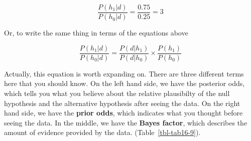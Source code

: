 \documentclass[
  a4paper,
]{book}
\begin{document}
\[\frac{P(h_1|d)}{P(h_0|d)}=\frac{0.75}{0.25}=3\]

Or, to write the same thing in terms of the equations above

\[\frac{P(h_1|d)}{P(h_0|d)}=\frac{P(d|h_1)}{P(d|h_0)} \times \frac{P(h_1)}{P(h_0)}\]

Actually, this equation is worth expanding on. There are three different
terms here that you should know. On the left hand side, we have the
posterior odds, which tells you what you believe about the relative
plausibilty of the null hypothesis and the alternative hypothesis after
seeing the data. On the right hand side, we have the \textbf{prior
odds}, which indicates what you thought before seeing the data. In the
middle, we have the \textbf{Bayes factor}, which describes the amount of
evidence provided by the data. (Table~\ref{tbl-tab16-9}).

\hypertarget{tbl-tab16-9}{}
 
  \providecommand{\huxb}[2]{\arrayrulecolor[RGB]{#1}\global\arrayrulewidth=#2pt}
  \providecommand{\huxvb}[2]{\color[RGB]{#1}\vrule width #2pt}
  \providecommand{\huxtpad}[1]{\rule{0pt}{#1}}
  \providecommand{\huxbpad}[1]{\rule[-#1]{0pt}{#1}}
\end{document}
